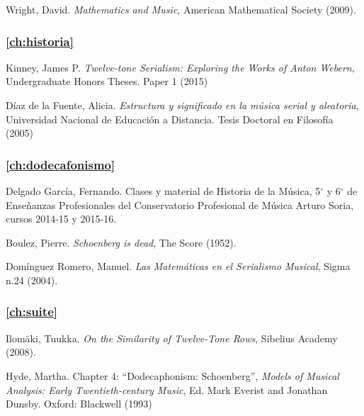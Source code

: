 	\begin{thebibliography}{00}
			
			{\sc Wright, David.} 
			\textit{Mathematics and Music},
			American Mathematical Society 
			(2009).			
			
			\subsubsection*{\autoref{ch:historia}}
			
			{\sc Kinney, James P.} 
			\textit{Twelve-tone Serialism: Exploring the Works of Anton Webern},
			Undergraduate Honors Theses.
			Paper 1
			(2015)
			
			{\sc Díaz de la Fuente, Alicia.} 
			\textit{Estructura y significado en la música serial y aleatoria},
			Universidad Nacional de Educación a Distancia.
			Tesis Doctoral en Filosofía
			(2005)			
			
			\subsubsection*{\autoref{ch:dodecafonismo}}
			
			{\sc Delgado García, Fernando.} 
			Clases y material de Historia de la Música, 5$^{\circ}$ y 6$^{\circ}$ de Enseñanzas Profesionales del Conservatorio Profesional de Música Arturo Soria, cursos 2014-15 y 2015-16.
			
			{\sc Boulez, Pierre.}
			\textit{Schoenberg is dead},
			The Score
			(1952).
			
			{\sc Domínguez Romero, Manuel.} 
			\textit{Las Matemáticas en el Serialismo Musical},
			Sigma n.24 
			(2004).

			\subsubsection*{\autoref{ch:suite}}
			
			{\sc Ilom\"aki, Tuukka.}
			\textit{On the Similarity of Twelve-Tone Rows},
			Sibelius Academy
			(2008).
			
			{\sc Hyde, Martha.} Chapter 4: “Dodecaphonism: Schoenberg”,
			\textit{Models of Musical Analysis: Early Twentieth-century Music},
			Ed. Mark Everist and Jonathan Dunsby.
			Oxford: Blackwell
			(1993)
					

\end{thebibliography}
